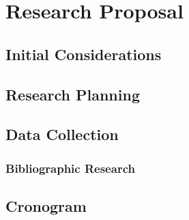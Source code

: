     \chapter{Research Proposal}
\label{ch:proposta}

\section{Initial Considerations}

\section{Research Planning}

\section{Data Collection}

\subsection{Bibliographic Research}

\section{Cronogram}
